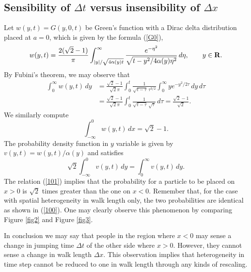 \documentclass[11pt]{amsart}
\def\R{{\bf R}}
\def\R{\mathbb{R}}
\def\R{{\bf R}}
\begin{document}
\subsection{Sensibility of $\Delta t$ versus insensibility of $\Delta x$}\label{sect.Answer2}
Let $w(y,t)=G(y,0,t)$ be Green's function with a Dirac delta distribution placed at $a=0$, which is given by the formula (\ref{G0}),
\begin{equation*}
w(y,t)=\frac{2(\sqrt{2}-1)}{\pi} \int_{|y|/\sqrt{4\alpha(y)t}}^\infty \frac{e^{-\eta^2}}{\sqrt{t-y^2/4\alpha(y)\eta^2}}\,d\eta,\qquad y\in\R.
\end{equation*}
By Fubini's theorem, we may observe that
\begin{align*}
\int_0^\infty w(y,t)\,dy &= \frac{\sqrt{2}-1}{\sqrt{2} \pi} \int_0^t \frac{1}{\sqrt{t-\tau} \,\tau^{3/2}} \int_0^\infty y e^{-y^2/2\tau} \,dy \,d\tau \\
&= \frac{\sqrt{2}-1}{\sqrt{2} \pi} \int_0^t \frac{1}{\sqrt{t-\tau} \,\sqrt{\tau}} \,d\tau = \frac{\sqrt{2} - 1}{\sqrt{2}}.
\end{align*}
We similarly compute
$$
\int_{-\infty}^0 w(y,t)\,dx = \sqrt{2} - 1.
$$
The probability density function in $y$ variable is given by $v(y,t)=w(y,t)/\alpha(y)$ and satisfies
\begin{equation}\label{101}
\sqrt{2}\int_{-\infty}^0 v(y,t)\,dy =\int_0^\infty v(y,t)\,dy.
\end{equation}
The relation (\ref{101}) implies that the probability for a particle to be placed on $x>0$ is $\sqrt{2}$ times greater than the one on $x<0$. Remember that, for the case with spatial heterogeneity in walk length only, the two probabilities are identical as shown in (\ref{100}). One may clearly observe this phenomenon by comparing Figure \ref{fig2} and Figure \ref{fig3}.

In conclusion we may say that people in the region where $x<0$ may sense a change in jumping time $\Delta t$ of the other side where $x>0$. However, they cannot sense a change in walk length $\Delta x$. This observation implies that heterogeneity in time step cannot be reduced to one in walk length through any kinds of rescaling.
\end{document}
